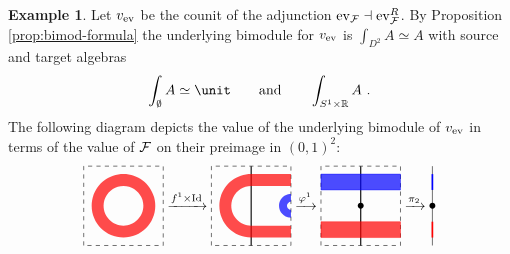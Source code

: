 \documentclass[10pt, reqno, twoside
, final
]{amsart}
\numberwithin{equation}{subsection}%
\theoremstyle{definition}
\theoremstyle{definition}
\theoremstyle{definition}
\theoremstyle{definition}
\theoremstyle{definition}
\theoremstyle{definition}
\theoremstyle{definition}
\theoremstyle{definition}
\theoremstyle{definition}
\theoremstyle{plain}
\theoremstyle{definition}
\theoremstyle{plain}
\theoremstyle{definition}
\theoremstyle{plain}
\theoremstyle{definition}
\theoremstyle{definition}
\theoremstyle{plain}
\theoremstyle{plain}
\theoremstyle{definition}
\newtheorem{ex}[defn]{Example}
\theoremstyle{plain}
\theoremstyle{plain}
\theoremstyle{plain}
\begin{document}
\begin{ex}
Let $v_{\mathrm{ev}}$ be the counit of the adjunction $\mathrm{ev}_{\mathcal{F}} \dashv \mathrm{ev}_{\mathcal{F}}^R$. By Proposition \ref{prop:bimod-formula} the underlying bimodule for $v_{\mathrm{ev}}$ is $\int_{D^2} A \simeq A$ with source and target algebras
\begin{equation*}
    \int_{\emptyset} A \simeq \unit \qquad \text{and} \qquad \int_{S^1 \times \R} A \ .
\end{equation*}
The following diagram depicts the value of the underlying bimodule of $v_{\mathrm{ev}}$ in terms of the value of $\mathcal{F}$ on their preimage in $(0,1)^2$:
\begin{equation*}
  \begin{tikzpicture}[baseline=0.9cm]
    \draw[dashed] (0,0) rectangle (2,2);
    \fill[red, even odd rule, opacity=0.7]
    (1,1) circle (0.8)
    (1,1) circle (0.5);
\end{tikzpicture}
\xrightarrow{f^1 \times \Id}
\begin{tikzpicture}[baseline=0.9cm]
    \draw[dashed] (0,0) rectangle (2,2);
    \draw[thick] (1,2) -- (1,0);
    \fill[red,opacity=0.7] (2,0.2) -- (1,0.2) arc[start angle = 270, end angle = 90,radius = 0.8]  
    -- (2,1.8) -- (2,1.5) -- (1,1.5) arc[start angle = 90, end angle = 270,radius = 0.5] 
    -- (2,0.5) -- (2,0.2);
    \fill[blue,opacity=0.7] (2,0.7) arc[start angle = 270, end angle = 90,radius = 0.3]  
    -- (2,1.1)  arc[start angle = 90, end angle = 270,radius = 0.1]  -- (2,0.7) ;
\end{tikzpicture}
\xrightarrow{\varphi^{1}}
\begin{tikzpicture}[baseline=0.9cm]
    \draw[dashed] (0,0) rectangle (2,2);
    \draw[thick] (1,2) -- (1,0);
    \node[fill,circle,inner sep=1.5pt] at (1,1) {};
    \filldraw[red,opacity=0.7] (0,0.2) rectangle (2,0.6);
    \filldraw[blue,opacity=0.7] (0,1.4) rectangle (2,1.8);
\end{tikzpicture}
\xrightarrow{\pi_2}
\begin{tikzpicture}[baseline=0.9cm]
    \draw (1,2) -- (1,0);
    \node[fill,circle,inner sep=1.5pt] at (1,1) {};
    \draw[red,very thick] (1,0.2) -- (1,0.6);
    \draw[blue,very thick] (1,1.4) -- (1,1.8);
\end{tikzpicture}
\end{equation*}


\end{ex}
\end{document}
